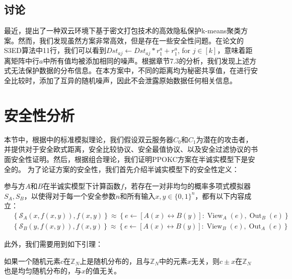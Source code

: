 \subsection{讨论}
\label{taolun}
最近，\cite{wu2020secure}提出了一种双云环境下基于密文打包技术的高效隐私保护k-means聚类方案。然而，我们发现虽然方案非常高效，但是存在一些安全性问题。在论文\cite{wu2020secure}的S3ED算法中11行，我们可以看到$D s t_{a j} \leftarrow D s t_{a j} * r_1^a+r_1^a$, for $j \in[k]$，意味着距离矩阵中行$ a $中所有值均被添加相同的噪声。根据\cite{liu2019toward}章节7.3的分析，我们发现上述方式无法保护数据的分布信息。在本方案中，不同的距离均为秘密共享值，在进行安全比较时，添加了互异的随机噪声，因此不会泄露原始数据任何相关信息。


\section{安全性分析}
\label{s3-lilun}
本节中，根据\cite{goldreich2004encryption}中的标准模拟理论，我们假设双云服务器$ C_0$和$ C_1$为潜在的攻击者，并提供对于安全欧式距离，安全比较协议、安全最值协议、以及安全过滤协议的书面安全性证明。然后，根据组合理论，我们证明PPOKC方案在半诚实模型下是安全的。 为了论证方案的安全性，我们首先介绍半诚实模型下的安全性定义\cite{bogdanov2008sharemind}：
\begin{definition}
参与方$ A $和$ B $在半诚实模型下计算函数$ f $，若存在一对非均匀的概率多项式模拟器$ S_A,S_B $，以使得对于每一个安全参数$ n $和所有输入$ x,y\in\{0,1\}^n $，都有以下内容成立：
\begin{equation}
	\begin{aligned}
		& \left\{\mathcal{S}_A(x, f(x, y)), f(x, y)\right\} \approx\left\{e \leftarrow[A(x) \leftrightarrow B(y)]: \operatorname{View}_A(e), \operatorname{Out}_B(e)\right\} \\
		& \left\{\mathcal{S}_B(y, f(x, y)), f(x, y)\right\} \approx\left\{e \leftarrow[A(x) \leftrightarrow B(y)]: \operatorname{View}_B(e), \operatorname{Out}_A(e)\right\}
	\end{aligned}
\end{equation}
\end{definition}

此外，我们需要用到如下引理：

\begin{lemma}
\label{s3-lemma1}
如果一个随机元素$ c $在$ \mathbb{Z}_N $上是随机分布的，且与$ \mathbb{Z}_N $中的元素$ x $无关，则$ c\pm x$在$ \mathbb{Z}_N $也是均匀随机分布的，与$ x $的值无关。
\end{lemma}

